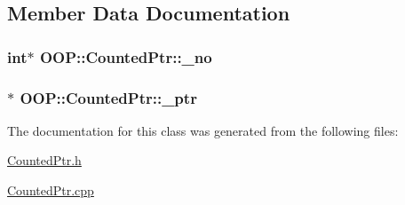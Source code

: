 \subsection{\-Member \-Data \-Documentation}
\hypertarget{classOOP_1_1CountedPtr_a9d5241ddb1470e29311d70f8d8ac451b}{
\subsubsection[{\-\_\-no}]{\setlength{\rightskip}{0pt plus 5cm}int$\ast$ {\bf \-O\-O\-P\-::\-Counted\-Ptr\-::\-\_\-no}}}\label{classOOP_1_1CountedPtr_a9d5241ddb1470e29311d70f8d8ac451b}
\hypertarget{classOOP_1_1CountedPtr_a2bd5db7ffc59b7811e484c3e858950bd}{
\subsubsection[{\-\_\-ptr}]{$\ast$ {\bf \-O\-O\-P\-::\-Counted\-Ptr\-::\-\_\-ptr}}}\label{classOOP_1_1CountedPtr_a2bd5db7ffc59b7811e484c3e858950bd}


\-The documentation for this class was generated from the following files\-:\begin{DoxyCompactItemize}
\item 
\hyperlink{CountedPtr_8h}{\-Counted\-Ptr.\-h}\item 
\hyperlink{CountedPtr_8cpp}{\-Counted\-Ptr.\-cpp}\end{DoxyCompactItemize}
